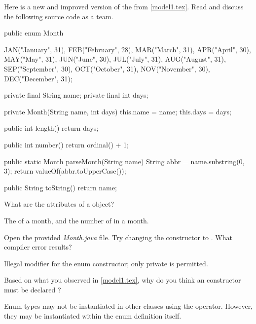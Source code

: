 
Here is a new and improved version of the  from \ref{model1.tex}.
Read and discuss the following source code as a team.

\medskip

\begin{javabox}
public enum Month {

    JAN("January", 31),
    FEB("February", 28),
    MAR("March", 31),
    APR("April", 30),
    MAY("May", 31),
    JUN("June", 30),
    JUL("July", 31),
    AUG("August", 31),
    SEP("September", 30),
    OCT("October", 31),
    NOV("November", 30),
    DEC("December", 31);

    private final String name;
    private final int days;

    private Month(String name, int days) {
        this.name = name;
        this.days = days;
    }

    public int length() {
        return days;
    }

    public int number() {
        return ordinal() + 1;
    }

    public static Month parseMonth(String name) {
        String abbr = name.substring(0, 3);
        return valueOf(abbr.toUpperCase());
    }

    public String toString() {
        return name;
    }

}
\end{javabox}




\Q What are the attributes of a  object?

\begin{answer}[3em]
The  of a month, and the number of  in a month.
\end{answer}


\Q Open the provided \textit{Month.java} file.
Try changing the constructor to .
What compiler error results?

\begin{answer}[3em]
Illegal modifier for the enum constructor; only private is permitted.
\end{answer}


\Q Based on what you observed in \ref{model1.tex}, why do you think an  constructor must be declared ?

\begin{answer}
Enum types may not be instantiated in other classes using the  operator.
However, they may be instantiated within the enum definition itself.
\end{answer}


